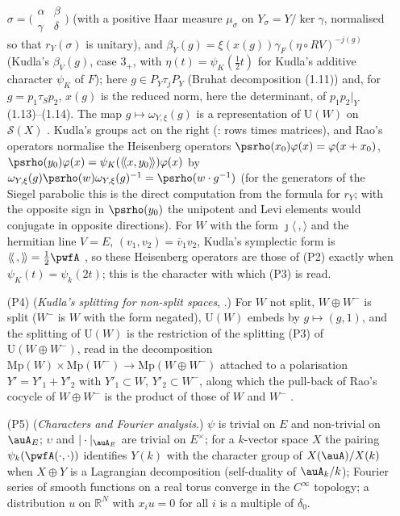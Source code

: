 \documentclass[10pt]{amsart}
\theoremstyle{definition}
\theoremstyle{remark}
\newcommand{\R}{\mathbb R}
\providecommand{\auS}{\mathcal S}
\providecommand{\auU}{\mathrm U}
\providecommand{\aubar}[1]{\overline{#1}}
\begin{document}
\begin{itemize}
$\sigma=\bigl(\begin{smallmatrix}\alpha&\beta\\\gamma&\delta\end{smallmatrix}\bigr)$ (with a
positive Haar measure $\mu_\sigma$ on $Y_\sigma=Y/\ker\gamma$, normalised so that $r_Y(\sigma)$ is
unitary), and $\beta_Y(g)=\xi(x(g))\gamma_F(\eta\circ RV)^{-j(g)}$ (Kudla's $\beta_V(g)$, case $3_+$,
with $\eta(t)=\psi_K(\frac12t)$ for Kudla's additive character $\psi_K$ of $F$); here $g\in P_Y\tau_jP_Y$ (Bruhat
decomposition (1.11)) and, for $g=p_1\tau_Sp_2$, $x(g)$ is the reduced norm, here the determinant, of
$p_1p_2|_Y$ (1.13)--(1.14). The map
$g\mapsto\omega_{Y,\xi}(g)$ is a representation of $\auU(W)$ on $\auS(X)$ \cite[p.~400]{KudlaSplitting}.
Kudla's groups act on the right (\cite[p.~362]{KudlaSplitting}: rows times matrices), and Rao's
operators normalise the Heisenberg operators $\psrho(x_0)\varphi(x)=\varphi(x+x_0)$,
$\psrho(y_0)\varphi(x)=\psi_K(\langle\!\langle x,y_0\rangle\!\rangle)\varphi(x)$ by
$\omega_{Y,\xi}(g)\psrho(w)\omega_{Y,\xi}(g)^{-1}=\psrho(w\cdot g^{-1})$ (for the generators of the
Siegel parabolic this is the direct computation from the formula for $r_Y$; with the opposite sign in
$\psrho(y_0)$ the unipotent and Levi elements would conjugate in opposite directions). For $W$ with
the form $\jmath\langle\,,\rangle$ and the hermitian line $V=E$, $(v_1,v_2)=\aubar v_1v_2$, Kudla's
symplectic form is $\langle\!\langle\,,\rangle\!\rangle=\frac12\pwfA$ \cite[(0.8), (0.9), p.~364]{KudlaSplitting},
so these Heisenberg operators are those of (P2) exactly when $\psi_K(t)=\psi_k(2t)$; this is the
character with which (P3) is read.
\item[(P4)] (\emph{Kudla's splitting for non-split spaces}, \cite[(4.1)--(4.5), p.~389, and
Proposition~4.1, p.~390]{KudlaSplitting}.) For $W$ not split, $W\oplus W^-$ is split ($W^-$ is $W$ with
the form negated), $\auU(W)$ embeds by $g\mapsto(g,1)$, and the splitting of $\auU(W)$ is the
restriction of the splitting (P3) of $\auU(W\oplus W^-)$, read in the decomposition
$\mathrm{Mp}(W)\times\mathrm{Mp}(W^-)\to\mathrm{Mp}(W\oplus W^-)$ attached to a polarisation
$Y'=Y'_1+Y'_2$ with $Y'_1\subset W$, $Y'_2\subset W^-$, along which the pull-back of Rao's cocycle
of $W\oplus W^-$ is the product of those of $W$ and $W^-$ \cite[p.~389]{KudlaSplitting}.
\item[(P5)] (\emph{Characters and Fourier analysis}.) $\psi$ is trivial on $E$ and non-trivial on
$\auA_E$; $\upsilon$ and $|\cdot|_{\auA_E}$ are trivial on $E^\times$; for a $k$-vector space $X$
the pairing $\psi_k(\pwfA(\cdot,\cdot))$ identifies $Y(k)$ with the character group of
$X(\auA)/X(k)$ when $X\oplus Y$ is a Lagrangian decomposition (self-duality of $\auA_k/k$); Fourier
series of smooth functions on a real torus converge in the $C^\infty$ topology; a distribution $u$
on $\R^N$ with $x_iu=0$ for all $i$ is a multiple of $\delta_0$.
\end{itemize}
\end{document}
